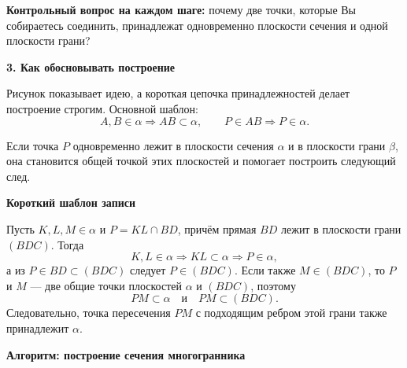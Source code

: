\documentclass[a4paper,12pt]{article}
\newcommand{\sectitle}[1]{%
  \vspace{0.55em}%
  {\Large\bfseries\color{darkaccent}#1\par}%
  \vspace{0.2em}%
  \noindent{\color{accent}\rule{\linewidth}{0.8pt}}%
  \vspace{0.45em}%
}
\newcommand{\subtopic}[1]{%
  \vspace{0.4em}%
  {\large\bfseries\color{darkaccent}#1\par}%
  \vspace{0.15em}%
}
\newcommand{\important}[1]{{\bfseries\color{darkaccent}#1}}
\begin{document}
\important{Контрольный вопрос на каждом шаге:} почему две точки, которые Вы собираетесь соединить, принадлежат одновременно плоскости сечения и одной плоскости грани?

\sectitle{3. Как обосновывать построение}

Рисунок показывает идею, а короткая цепочка принадлежностей делает построение строгим. Основной шаблон:
\[
A,B\in\alpha
\Longrightarrow
AB\subset\alpha,
\qquad
P\in AB
\Longrightarrow
P\in\alpha.
\]

Если точка $P$ одновременно лежит в плоскости сечения $\alpha$ и в плоскости грани $\beta$, она становится общей точкой этих плоскостей и помогает построить следующий след.

\subtopic{Короткий шаблон записи}

Пусть $K,L,M\in\alpha$ и $P=KL\cap BD$, причём прямая $BD$ лежит в плоскости грани $(BDC)$. Тогда
\[
K,L\in\alpha
\Longrightarrow
KL\subset\alpha
\Longrightarrow
P\in\alpha,
\]
а из $P\in BD\subset(BDC)$ следует $P\in(BDC)$. Если также $M\in(BDC)$, то $P$ и $M$ --- две общие точки плоскостей $\alpha$ и $(BDC)$, поэтому
\[
PM\subset\alpha
\quad\text{и}\quad
PM\subset(BDC).
\]
Следовательно, точка пересечения $PM$ с подходящим ребром этой грани также принадлежит $\alpha$.

\clearpage
\thispagestyle{empty}

\begin{center}
{\Large\bfseries\color{darkaccent}Алгоритм: построение сечения многогранника}
\end{center}

\vspace{0.65cm}
\end{document}
